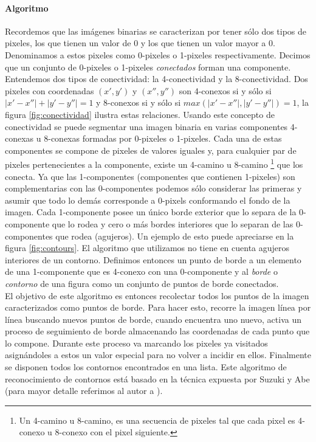 	\paragraph{Algoritmo} 
	Recordemos que las im\'agenes binarias se caracterizan por tener s\'olo 
	dos tipos de pixeles, los que tienen un valor de $0$ y los que tienen 
	un valor mayor a 0. Denominamos a estos pixeles como 
	0-pixeles o 1-pixeles respectivamente. Decimos que un conjunto de 
	0-pixeles o 1-pixeles \textit{conectados} forman una componente. Entendemos dos tipos de conectividad:
	la 4-conectividad y la 8-conectividad. Dos pixeles con coordenadas 
	$(x',y')$ y $(x'',y'')$ son 4-conexos si y s\'olo si 
	$|x' - x''| + |y'-y''| = 1$ y 8-conexos si y s\'olo si $max(|x'-x''|,|y'-y''|)=1$, la figura \ref{fig:conectividad} ilustra estas relaciones.
	Usando este concepto de conectividad se puede segmentar una imagen 
	binaria en varias componentes 4-conexas u 8-conexas formadas por 
	 0-pixeles o 1-pixeles. Cada una de estas
	componentes se compone de pixeles de valores iguales y, para cualquier 
	par de pixeles pertenecientes a la componente, existe un 
	4-camino u 8-camino \footnote{ Un 4-camino u 8-camino, es una secuencia 
	de pixeles tal que cada pixel es 4-conexo u 8-conexo con el pixel 
	siguiente.} que los
	conecta. Ya que las 1-componentes (componentes que contienen 
	1-pixeles) son complementarias con las 0-componentes podemos s\'olo considerar las primeras y asumir que todo
	lo dem\'as corresponde a 0-pixels conformando el fondo de la imagen. Cada 
	1-componente posee un \'unico borde exterior que lo separa de la 0-componente que lo rodea y cero o m\'as bordes interiores que lo separan de las 0-componentes que rodea (agujeros). Un ejemplo de esto puede apreciarse
	en la figura \ref{fig:contours}. El algoritmo que utilizamos no tiene 
	en cuenta agujeros interiores de un contorno. Definimos entonces un 
	punto de borde a un elemento de una 1-componente que es 4-conexo con 
	una 0-componente y al \textit{borde} o \textit{contorno} de una figura 
	como un conjunto de puntos de borde conectados.\\
	\indent El objetivo de este algoritmo es entonces recolectar todos los 
	puntos de la imagen caracterizados como puntos de borde. Para 
	hacer esto, recorre la imagen l\'inea por l\'inea buscando nuevos puntos de borde, cuando encuentra
	uno nuevo, activa un proceso de seguimiento de borde almacenando las 
	coordenadas de cada punto que lo compone. Durante este proceso va 
	marcando los pixeles ya 
	visitados asign\'andoles a estos un valor especial para no volver a 
	incidir en ellos. Finalmente se disponen todos los contornos encontrados en una lista.
	Este algoritmo de reconocimiento de contornos est\'a basado en la 
	t\'ecnica expuesta por Suzuki y Abe (para mayor detalle referimos al 
	autor a \cite{suzuki85}).
	
